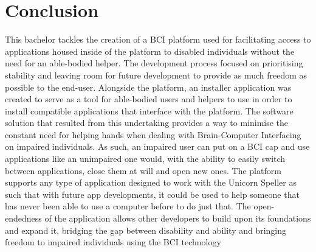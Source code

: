 
\chapter{Conclusion}\label{cap:ending}
This bachelor tackles the creation of a BCI platform used for facilitating access to applications housed inside of the platform to disabled individuals without the need for an able-bodied helper.
\vspace{\baselineskip}\newline
The development process focused on prioritising stability and leaving room for future development to provide as much freedom as possible to the end-user. Alongside the platform, an installer application was created to serve as a tool for able-bodied users and helpers to use in order to install compatible applications that interface with the platform.
\vspace{\baselineskip}\newline
The software solution that resulted from this undertaking provides a way to minimise the constant need for helping hands when dealing with Brain-Computer Interfacing on impaired individuals. As such, an impaired user can put on a BCI cap and use applications like an unimpaired one would, with the ability to easily switch between applications, close them at will and open new ones. The platform supports any type of application designed to work with the Unicorn Speller as such that with future app developments, it could be used to help someone that has never been able to use a computer before to do just that. 
\vspace{\baselineskip}\newline
The open-endedness of the application allows other developers to build upon its foundations and expand it, bridging the gap between disability and ability and bringing freedom to impaired individuals using the BCI technology